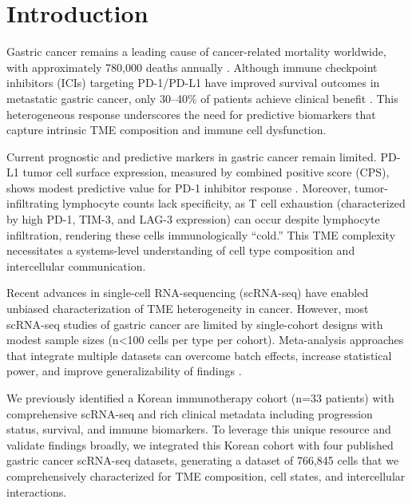 \documentclass[12pt,twoside]{article}
\begin{document}
\newpage


\section{Introduction}

Gastric cancer remains a leading cause of cancer-related mortality worldwide, with approximately 780,000 deaths annually \cite{WHO2023}. Although immune checkpoint inhibitors (ICIs) targeting PD-1/PD-L1 have improved survival outcomes in metastatic gastric cancer, only 30--40\% of patients achieve clinical benefit \cite{KEYNOTE589}. This heterogeneous response underscores the need for predictive biomarkers that capture intrinsic TME composition and immune cell dysfunction.

Current prognostic and predictive markers in gastric cancer remain limited. PD-L1 tumor cell surface expression, measured by combined positive score (CPS), shows modest predictive value for PD-1 inhibitor response \cite{CheckMate649}. Moreover, tumor-infiltrating lymphocyte counts lack specificity, as T cell exhaustion (characterized by high PD-1, TIM-3, and LAG-3 expression) can occur despite lymphocyte infiltration, rendering these cells immunologically ``cold.'' This TME complexity necessitates a systems-level understanding of cell type composition and intercellular communication.

Recent advances in single-cell RNA-sequencing (scRNA-seq) have enabled unbiased characterization of TME heterogeneity in cancer. However, most scRNA-seq studies of gastric cancer are limited by single-cohort designs with modest sample sizes (n<100 cells per type per cohort). Meta-analysis approaches that integrate multiple datasets can overcome batch effects, increase statistical power, and improve generalizability of findings \cite{Luecken2019}.

We previously identified a Korean immunotherapy cohort (n=33 patients) with comprehensive scRNA-seq and rich clinical metadata including progression status, survival, and immune biomarkers. To leverage this unique resource and validate findings broadly, we integrated this Korean cohort with four published gastric cancer scRNA-seq datasets, generating a dataset of 766,845 cells that we comprehensively characterized for TME composition, cell states, and intercellular interactions.
\end{document}
